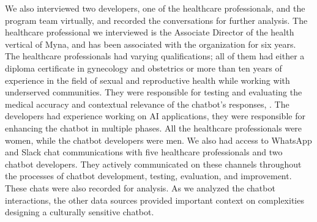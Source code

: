 We also interviewed two developers, one of the healthcare professionals, and the program team virtually,
and recorded the conversations for further analysis. %
The healthcare professional we interviewed is the Associate Director of the health vertical of Myna, and has been associated with the organization for six years. 
The healthcare professionals had varying qualifications; all of them had either a diploma certificate in gynecology and obstetrics or more than ten years of experience in the field of sexual and reproductive health while working with underserved communities. 
They were responsible for testing and evaluating the medical accuracy and contextual relevance of the chatbot's responses, . The developers had experience working on AI applications, they were responsible for enhancing the chatbot in multiple phases. 
All the healthcare professionals were women, while the chatbot developers were men.
We also had access to WhatsApp and Slack chat communications with five healthcare professionals and two chatbot developers. 
They actively communicated on these channels throughout the processes of chatbot development, testing, evaluation, and improvement. These chats were also recorded for analysis. 
As we analyzed the chatbot interactions, the other data sources provided important context on complexities designing a culturally sensitive chatbot.



